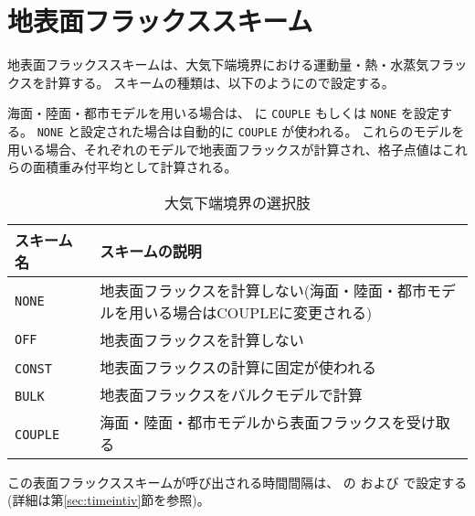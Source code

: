 \section{地表面フラックススキーム}
\label{sec:basic_usel_surface}
地表面フラックススキームは、大気下端境界における運動量・熱・水蒸気フラックスを計算する。
スキームの種類は、以下のようにので設定する。

海面・陸面・都市モデルを用いる場合は、 に \verb|COUPLE| もしくは \verb|NONE| を設定する。
\verb|NONE| と設定された場合は自動的に \verb|COUPLE| が使われる。
これらのモデルを用いる場合、それぞれのモデルで地表面フラックスが計算され、格子点値はこれらの面積重み付平均として計算される。

\begin{table}[h]
\begin{center}
  \caption{大気下端境界の選択肢}
  \label{tab:nml_atm_sf}
  \begin{tabularx}{150mm}{lX} \hline
    \rowcolor[gray]{0.9}  スキーム名 & スキームの説明\\ \hline
      \verb|NONE|         & 地表面フラックスを計算しない(海面・陸面・都市モデルを用いる場合はCOUPLEに変更される) \\
      \verb|OFF|          & 地表面フラックスを計算しない \\
      \verb|CONST|   　　　& 地表面フラックスの計算に固定が使われる \\
      \verb|BULK|    　　　& 地表面フラックスをバルクモデルで計算 \\
      \verb|COUPLE|  　　　& 海面・陸面・都市モデルから表面フラックスを受け取る \\
    \hline
  \end{tabularx}
\end{center}
\end{table}

この表面フラックススキームが呼び出される時間間隔は、
 の  および  で設定する(詳細は第\ref{sec:timeintiv}節を参照)。


